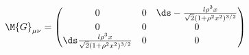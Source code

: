 \begin{equation}
\M{G}_{\mu\nu}=\begin{pmatrix} 0 & 0 &\ds -\frac{l\rho^3x}{\sqrt{2}(1+\rho^2x^2)^{3/2}} \\ 0 & 0
& 0 \\\ds \frac{l\rho^3x}{\sqrt{2}(1+\rho^2x^2)^{3/2}} & 0 & 0 \end{pmatrix}
\label{2.30}
\end{equation}

